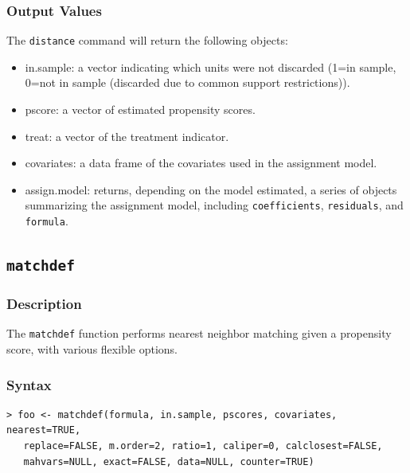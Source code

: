 \documentclass[oneside,letterpaper,titlepage]{article}
\begin{document}
\begin{appendix}
\subsubsection{Output Values}
The \texttt{distance} command will return the following objects:
\begin{itemize}
\item{in.sample}: a vector indicating which units were not discarded (1=in sample, 0=not in sample (discarded due to common support restrictions)). 
\item{pscore}: a vector of estimated propensity scores. 
\item{treat}: a vector of the treatment indicator.
\item{covariates}: a data frame of the covariates used in the
  assignment model.
\item{assign.model}: returns, depending on the model estimated, a 
  series of objects summarizing the assignment model, including
  \texttt{coefficients}, \texttt{residuals},
  and \texttt{formula}. 
\end{itemize}

\subsection{\texttt{matchdef}}
\subsubsection{Description}
The \texttt{matchdef} function performs nearest neighbor matching
given a propensity score, with various flexible options. 

\subsubsection{Syntax}
\begin{verbatim}
> foo <- matchdef(formula, in.sample, pscores, covariates, nearest=TRUE,
   replace=FALSE, m.order=2, ratio=1, caliper=0, calclosest=FALSE,
   mahvars=NULL, exact=FALSE, data=NULL, counter=TRUE)
\end{verbatim}


\end{appendix}
\end{document}
